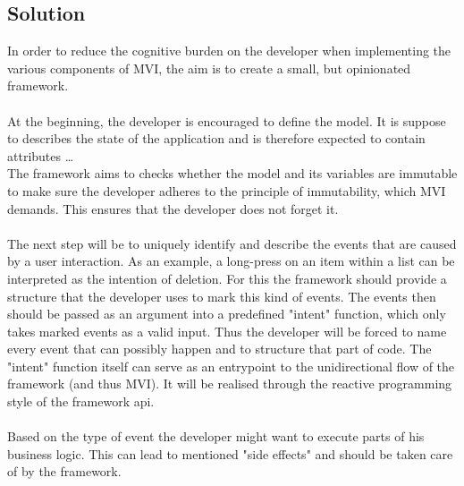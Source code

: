 \subsection{Solution}
\label{subsec:solution}

In order to reduce the cognitive burden on the developer when implementing the various components of MVI, the aim 
is to create a small, but opinionated framework.
\\
\\
At the beginning, the developer is encouraged to define the model. It is suppose to describes the state of the application and is therefore expected to contain
attributes
\dots 
\\
The framework aims to checks whether the model and its variables are immutable to make sure the developer adheres to the principle of immutability,
which MVI demands. This ensures that the developer does not forget it.
\\
\\
The next step will be to uniquely identify and describe the events that are caused by a user interaction.
As an example, a long-press on an item within a list can be interpreted as the intention of deletion. 
For this the framework should provide a structure that the developer uses to mark this kind of events.
The events then should be passed as an argument into a predefined "intent" function, which only takes marked events as a valid input.
Thus the developer will be forced to name every event that can possibly happen and to structure that part of code.
The "intent" function itself can serve as an entrypoint to the unidirectional flow of the framework (and thus MVI). It will be realised 
through the reactive programming style of the framework api.
\\
\\
Based on the type of event the developer might want to execute parts of his business logic. This can lead to mentioned "side effects" and
should be taken care of by the framework.


